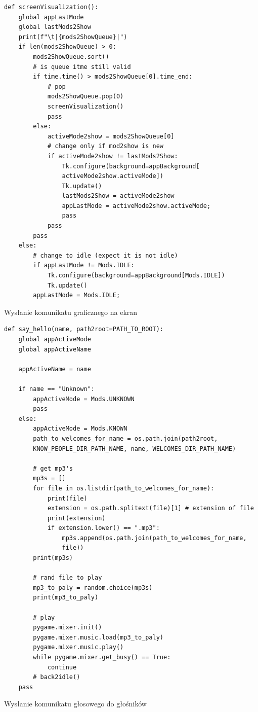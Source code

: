 \documentclass[a4paper,12pt,reqno]{article}
\begin{document}
\begin{listing}[H]%
\begin{mdframed}[backgroundcolor=codebg]
\begin{verbatim}
def screenVisualization():
    global appLastMode
    global lastMods2Show
    print(f"\t|{mods2ShowQueue}|")
    if len(mods2ShowQueue) > 0:
        mods2ShowQueue.sort()
        # is queue itme still valid
        if time.time() > mods2ShowQueue[0].time_end:
            # pop
            mods2ShowQueue.pop(0)
            screenVisualization()
            pass
        else:
            activeMode2show = mods2ShowQueue[0]
            # change only if mod2show is new
            if activeMode2show != lastMods2Show:
                Tk.configure(background=appBackground[
                activeMode2show.activeMode])
                Tk.update()
                lastMods2Show = activeMode2show
                appLastMode = activeMode2show.activeMode;
                pass
            pass
        pass
    else:
        # change to idle (expect it is not idle)
        if appLastMode != Mods.IDLE:
            Tk.configure(background=appBackground[Mods.IDLE])
            Tk.update()
        appLastMode = Mods.IDLE;
\end{verbatim}
\end{mdframed}
\caption{Wysłanie komunikatu graficznego na ekran}
\label{listing:py1}
\end{listing}

\begin{listing}[H]%
\begin{mdframed}[backgroundcolor=codebg]
\begin{verbatim}
def say_hello(name, path2root=PATH_TO_ROOT):
    global appActiveMode
    global appActiveName
    
    appActiveName = name
    
    if name == "Unknown":
        appActiveMode = Mods.UNKNOWN
        pass
    else:
        appActiveMode = Mods.KNOWN
        path_to_welcomes_for_name = os.path.join(path2root,
        KNOW_PEOPLE_DIR_PATH_NAME, name, WELCOMES_DIR_PATH_NAME)
        
        # get mp3's
        mp3s = []
        for file in os.listdir(path_to_welcomes_for_name):
            print(file)
            extension = os.path.splitext(file)[1] # extension of file
            print(extension)
            if extension.lower() == ".mp3":
                mp3s.append(os.path.join(path_to_welcomes_for_name, 
                file))
        print(mp3s)        
        
        # rand file to play
        mp3_to_paly = random.choice(mp3s)
        print(mp3_to_paly)
        
        # play      
        pygame.mixer.init()
        pygame.mixer.music.load(mp3_to_paly)
        pygame.mixer.music.play()
        while pygame.mixer.get_busy() == True:
            continue
        # back2idle()
    pass
\end{verbatim}
\end{mdframed}
\caption{Wysłanie komunikatu głosowego do głośników}
\label{listing:py1}
\end{listing}
\end{document}

